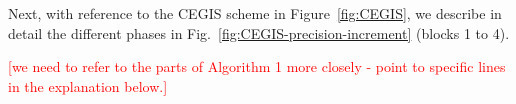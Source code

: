 \documentclass[twocolumn]{autart}    %
\newtheorem{theorem}{Theorem}
\newtheorem{proof}{Proof}
\renewcommand{\note}[1]{\textcolor{red}{[#1]}}
\begin{document}
%
%

Next, 
with reference to the CEGIS scheme in Figure~\ref{fig:CEGIS}, 
we describe in detail the different phases in Fig.~\ref{fig:CEGIS-precision-increment} (blocks 1 to 4). 

\note{we need to refer to the parts of Algorithm 1 more closely - point to specific lines in the explanation below.} 
\end{document}
